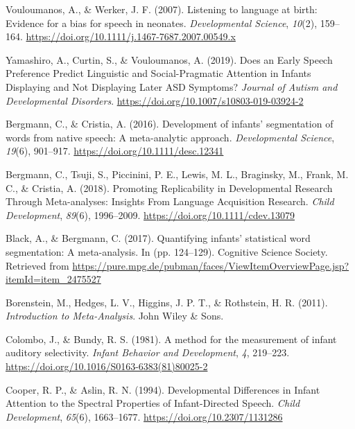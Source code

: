 \documentclass[
  man]{apa6}
\begin{document}
\leavevmode\hypertarget{ref-vouloumanos_listening_2007}{}%
Vouloumanos, A., \& Werker, J. F. (2007). Listening to language at birth: Evidence for a bias for speech in neonates. \emph{Developmental Science}, \emph{10}(2), 159--164. \url{https://doi.org/10.1111/j.1467-7687.2007.00549.x}

\leavevmode\hypertarget{ref-yamashiro_does_2019}{}%
Yamashiro, A., Curtin, S., \& Vouloumanos, A. (2019). Does an Early Speech Preference Predict Linguistic and Social-Pragmatic Attention in Infants Displaying and Not Displaying Later ASD Symptoms? \emph{Journal of Autism and Developmental Disorders}. \url{https://doi.org/10.1007/s10803-019-03924-2}

\leavevmode\hypertarget{ref-bergmann_development_2016}{}%
Bergmann, C., \& Cristia, A. (2016). Development of infants' segmentation of words from native speech: A meta-analytic approach. \emph{Developmental Science}, \emph{19}(6), 901--917. \url{https://doi.org/10.1111/desc.12341}

\leavevmode\hypertarget{ref-bergmann_promoting_2018}{}%
Bergmann, C., Tsuji, S., Piccinini, P. E., Lewis, M. L., Braginsky, M., Frank, M. C., \& Cristia, A. (2018). Promoting Replicability in Developmental Research Through Meta-analyses: Insights From Language Acquisition Research. \emph{Child Development}, \emph{89}(6), 1996--2009. \url{https://doi.org/10.1111/cdev.13079}

\leavevmode\hypertarget{ref-black_quantifying_2017}{}%
Black, A., \& Bergmann, C. (2017). Quantifying infants' statistical word segmentation: A meta-analysis. In (pp. 124--129). Cognitive Science Society. Retrieved from \url{https://pure.mpg.de/pubman/faces/ViewItemOverviewPage.jsp?itemId=item_2475527}

\leavevmode\hypertarget{ref-borenstein_introduction_2011}{}%
Borenstein, M., Hedges, L. V., Higgins, J. P. T., \& Rothstein, H. R. (2011). \emph{Introduction to Meta-Analysis}. John Wiley \& Sons.

\leavevmode\hypertarget{ref-colombo_method_1981}{}%
Colombo, J., \& Bundy, R. S. (1981). A method for the measurement of infant auditory selectivity. \emph{Infant Behavior and Development}, \emph{4}, 219--223. \url{https://doi.org/10.1016/S0163-6383(81)80025-2}

\leavevmode\hypertarget{ref-cooper_developmental_1994}{}%
Cooper, R. P., \& Aslin, R. N. (1994). Developmental Differences in Infant Attention to the Spectral Properties of Infant-Directed Speech. \emph{Child Development}, \emph{65}(6), 1663--1677. \url{https://doi.org/10.2307/1131286}
\end{document}
